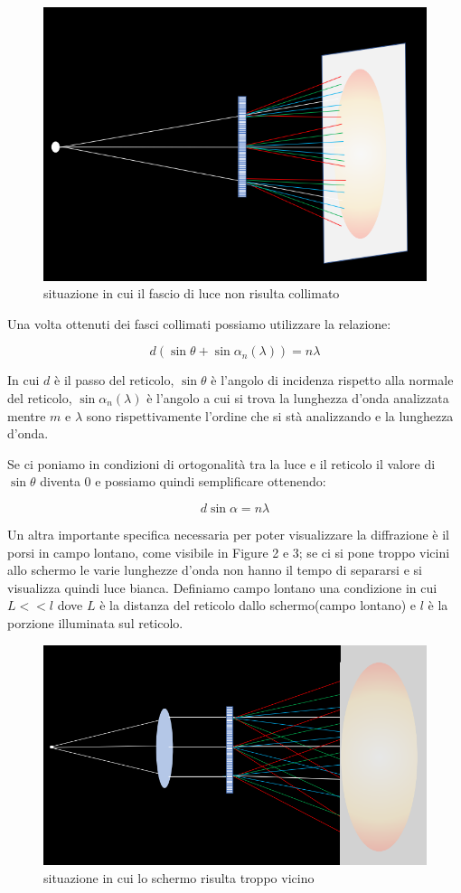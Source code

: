 \documentclass{article}
\begin{document}
\begin{figure}[h!]
  \centering
  \includegraphics[width=0.4\linewidth]{IM reticolo non collimato}
  \caption{situazione in cui il fascio di luce non risulta collimato}
\end{figure}


Una volta ottenuti dei fasci collimati possiamo utilizzare la relazione:

\begin{equation}
d (\sin \theta + \sin \alpha_n(\lambda)) = n \lambda
\end{equation}

In cui $d$ è il passo del reticolo, $\sin \theta$ è l'angolo di incidenza rispetto alla normale del reticolo, $\sin \alpha_n(\lambda)$ è l'angolo a cui si trova la lunghezza d'onda analizzata mentre $m$ e    $\lambda$ sono rispettivamente l'ordine che si stà analizzando e la lunghezza d'onda.

Se ci poniamo in condizioni di ortogonalità tra la luce e il reticolo il valore di $\sin \theta$ diventa 0 e possiamo quindi semplificare ottenendo:

\begin{equation}
d \sin \alpha = n \lambda
\end{equation}

Un altra importante specifica necessaria per poter visualizzare la diffrazione è il porsi in campo lontano, come visibile in Figure 2 e 3; se ci si pone troppo vicini allo schermo le varie lunghezze d'onda non hanno il tempo di separarsi e si visualizza quindi luce bianca. Definiamo campo lontano una condizione in cui $L << l$ dove $L$ è la distanza del reticolo dallo schermo(campo lontano) e $l$ è la porzione illuminata sul reticolo.


\begin{figure}[h!]
  \centering
  \includegraphics[width=0.4\linewidth]{IM reticolo collimato vicino}
  \caption{situazione in cui lo schermo risulta troppo vicino}
\end{figure}
\end{document}
